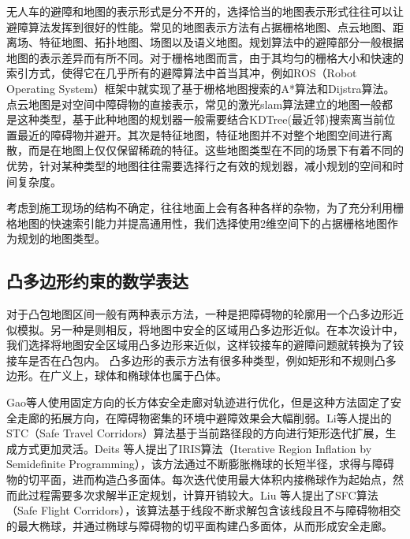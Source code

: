 \documentclass[master,academic]{ysuthesis} %
\begin{document}
	无人车的避障和地图的表示形式是分不开的，选择恰当的地图表示形式往往可以让避障算法发挥到很好的性能。常见的地图表示方法有占据栅格地图、点云地图、距离场、特征地图、拓扑地图、场图以及语义地图。规划算法中的避障部分一般根据地图的表示差异而有所不同。对于栅格地图而言，由于其均匀的栅格大小和快速的索引方式，使得它在几乎所有的避障算法中首当其冲，例如ROS（Robot Operating System）框架中就实现了基于栅格地图搜索的A*算法和Dijstra算法。点云地图是对空间中障碍物的直接表示，常见的激光slam算法建立的地图一般都是这种类型，基于此种地图的规划器一般需要结合KDTree(最近邻)搜索离当前位置最近的障碍物并避开。其次是特征地图，特征地图并不对整个地图空间进行离散，而是在地图上仅仅保留稀疏的特征。这些地图类型在不同的场景下有着不同的优势，针对某种类型的地图往往需要选择行之有效的规划器，减小规划的空间和时间复杂度。
	
	考虑到施工现场的结构不确定，往往地面上会有各种各样的杂物，为了充分利用栅格地图的快速索引能力并提高通用性，我们选择使用2维空间下的占据栅格地图作为规划的地图类型。
		\subsection{凸多边形约束的数学表达}
		对于凸包地图区间一般有两种表示方法，一种是把障碍物的轮廓用一个凸多边形近似模拟。另一种是则相反，将地图中安全的区域用凸多边形近似。在本次设计中，我们选择将地图安全区域用凸多边形来近似，这样铰接车的避障问题就转换为了铰接车是否在凸包内。
		凸多边形的表示方法有很多种类型，例如矩形和不规则凸多边形。在广义上，球体和椭球体也属于凸体。
		
		Gao等人使用固定方向的长方体安全走廊对轨迹进行优化，但是这种方法固定了安全走廊的拓展方向，在障碍物密集的环境中避障效果会大幅削弱\cite{Gao2018OnlineST}。Li等人提出的STC（Safe Travel Corridors）算法基于当前路径段的方向进行矩形迭代扩展，生成方式更加灵活\cite{BaiLi:2022}。Deits 等人提出了IRIS算法（Iterative Region Inflation by Semidefinite Programming），该方法通过不断膨胀椭球的长短半径，求得与障碍物的切平面，进而构造凸多面体\cite{Deits:2015}。每次迭代使用最大体积内接椭球作为起始点，然而此过程需要多次求解半正定规划，计算开销较大。Liu 等人提出了SFC算法（Safe Flight Corridors），该算法基于线段不断求解包含该线段且不与障碍物相交的最大椭球，并通过椭球与障碍物的切平面构建凸多面体，从而形成安全走廊\cite{SikangLiu:2017}。
		
\end{document}
